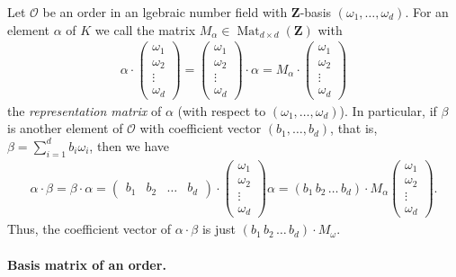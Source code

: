 \documentclass[a4paper,10pt]{article}
\newcommand{\Z}{\mathbf{Z}}
\newcommand{\Mat}{\operatorname{Mat}}
\begin{document}
Let $\mathcal O$ be an order in an lgebraic number field with $\Z$-basis $(\omega_1,\dotsc,\omega_d)$.
For an element $\alpha$ of $K$ we call the matrix $M_\alpha \in \Mat_{d \times d} (\Z)$ with
\begin{align*} \alpha \cdot \begin{pmatrix} \omega_1 \\ \omega_2 \\ \vdots \\ \omega_d \end{pmatrix} = \begin{pmatrix} \omega_1 \\ \omega_2 \\ \vdots \\ \omega_d \end{pmatrix} \cdot \alpha = M_\alpha \cdot \begin{pmatrix} \omega_1 \\ \omega_2 \\ \vdots \\ \omega_d \end{pmatrix}
\end{align*}
the \textit{representation matrix} of $\alpha$ (with respect to $(\omega_1,\dotsc,\omega_d)$).
In particular, if $\beta$ is another element of $\mathcal O$ with coefficient vector $(b_1,\dotsc,b_d)$, that is, $\beta = \sum_{i=1}^d b_i \omega_i$, then we have
\begin{align*} \alpha \cdot \beta = \beta \cdot \alpha = \begin{pmatrix} b_1 & b_2 & \dotsc & b_d \end{pmatrix} \cdot \begin{pmatrix} \omega_1 \\ \omega_2 \\ \vdots \\ \omega_d \end{pmatrix} \alpha = (b_1 \, b_2 \, \dotsc \, b_d ) \cdot M_\alpha \begin{pmatrix} \omega_1 \\ \omega_2 \\ \vdots \\ \omega_d \end{pmatrix}. \end{align*}
Thus, the coefficient vector of $\alpha \cdot \beta$ is just $(b_1\, b_2 \, \dotsc \, b_d ) \cdot M_\omega$.

\paragraph{Basis matrix of an order.}
\end{document}
